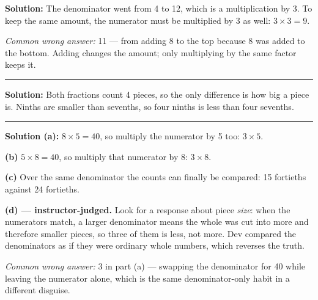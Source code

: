\documentclass[12pt]{article}
\begin{document}




\textbf{Solution:} The denominator went from 4 to 12, which is a multiplication by 3. To keep the same amount, the numerator must be multiplied by 3 as well: $3 \times 3 = 9$. 

\emph{Common wrong answer:} 11 --- from adding 8 to the top because 8 was added to the bottom. Adding changes the amount; only multiplying by the same factor keeps it.

\vspace{0.15cm}\noindent\rule{\linewidth}{0.2pt}\vspace{0.15cm}


\textbf{Solution:} Both fractions count 4 pieces, so the only difference is how big a piece is. Ninths are smaller than sevenths, so four ninths is less than four sevenths. 

\vspace{0.15cm}\noindent\rule{\linewidth}{0.2pt}\vspace{0.15cm}


\textbf{Solution (a):} $8 \times 5 = 40$, so multiply the numerator by 5 too: $3 \times 5$. 

\textbf{(b)} $5 \times 8 = 40$, so multiply that numerator by 8: $3 \times 8$. 

\textbf{(c)} Over the same denominator the counts can finally be compared: 15 fortieths against 24 fortieths. 

\textbf{(d) --- instructor-judged.} Look for a response about piece \emph{size}: when the numerators match, a larger denominator means the whole was cut into more and therefore smaller pieces, so three of them is less, not more. Dev compared the denominators as if they were ordinary whole numbers, which reverses the truth.

\emph{Common wrong answer:} 3 in part (a) --- swapping the denominator for 40 while leaving the numerator alone, which is the same denominator-only habit in a different disguise.
\end{document}
